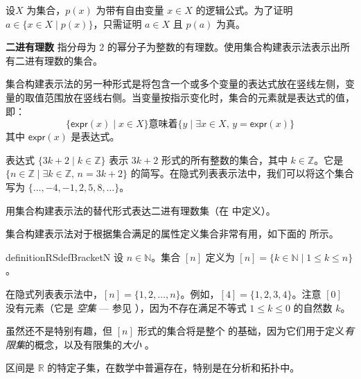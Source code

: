 \begin{strategy}
设$X$ 为集合，$p(x)$ 为带有自由变量 $x \in X$ 的逻辑公式。为了证明 $a \in \{ x \in X \mid p(x) \}$，只需证明 $a \in X$ 且 $p(a)$ 为真。
\end{strategy}

\begin{exercise}
\label{exDyadicRatioal}
\textbf{二进有理数} 指分母为 $2$ 的幂分子为整数的有理数。使用集合构建表示法表示出所有二进有理数的集合。
\end{exercise}

集合构建表示法的另一种形式是将包含一个或多个变量的表达式放在竖线左侧，变量的取值范围放在竖线右侧。当变量按指示变化时，集合的元素就是表达式的值，即：
\[ \{ \mathsf{expr}(x) \mid x \in X \} \text{意味着} \{ y \mid \exists x \in X,\, y = \mathsf{expr}(x) \} \]
其中 $\mathsf{expr}(x)$ 是表达式。

\begin{example}
表达式 $\{ 3k+2 \mid k \in \mathbb{Z} \}$ 表示 $3k+2$ 形式的所有整数的集合，其中 $k \in \mathbb{Z}$。它是 $\{ n \in \mathbb{Z} \mid \exists k \in \mathbb{Z},\, n=3k+2 \}$ 的简写。在隐式列表表示法中，我们可以将这个集合写为 $\{ \dots, {-4}, {-1}, 2, 5, 8, \dots \}$。
\end{example}

\begin{exercise}
用集合构建表示法的替代形式表达二进有理数集（在  中定义）。
\end{exercise}

集合构建表示法对于根据集合满足的属性定义集合非常有用，如下面的  所示。

\begin{restatable}{definition}{RSdefBracketN}
\label{defBracketN}
设 $n \in \mathbb{N}$。集合 $[n]$ 定义为 $[n] = \{ k \in \mathbb{N} \mid 1 \le k \le n \}$。
\end{restatable}

\begin{example}
\label{exBracketN}
在隐式列表表示法中，$[n] = \{ 1, 2, \dots, n \}$。例如，$[4] = \{ 1, 2, 3, 4 \}$。注意 $[0]$ 没有元素（它是 \textit{空集} --- 参见 ），因为不存在满足不等式 $1 \le k \le 0$ 的自然数 $k$。
\end{example}

虽然还不是特别有趣，但 $[n]$ 形式的集合将是整个  的基础，因为它们用于定义\textit{有限集}的概念，以及有限集的\textit{大小} 。

区间是 $\mathbb{R}$ 的特定子集，在数学中普遍存在，特别是在分析和拓扑中。

